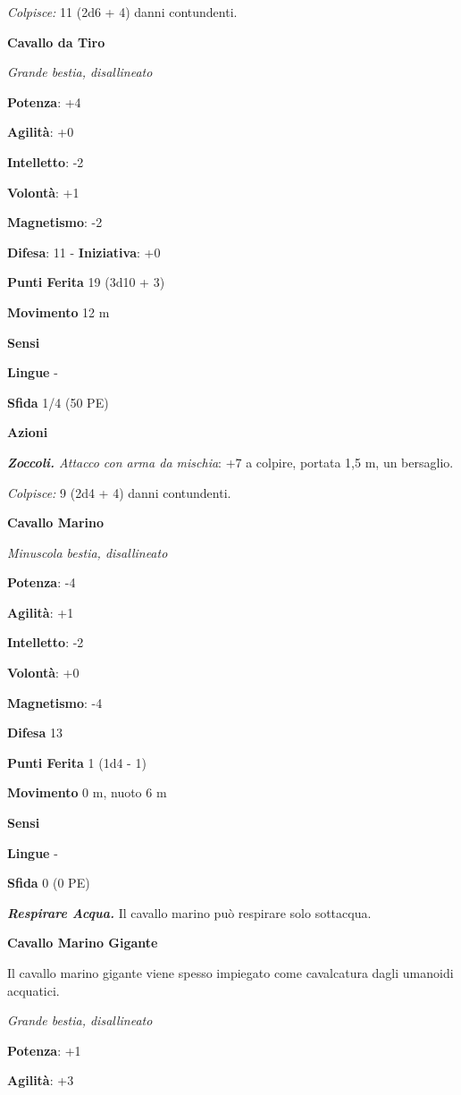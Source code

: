 \begin{multicols}{2}
\emph{Colpisce:} 11 (2d6 + 4) danni contundenti.

\textbf{Cavallo da Tiro}

\emph{Grande bestia, disallineato}

\textbf{Potenza}: +4

\textbf{Agilità}: +0

\textbf{Intelletto}: -2

\textbf{Volontà}: +1

\textbf{Magnetismo}: -2

\textbf{Difesa}: 11 - \textbf{Iniziativa}: +0

\textbf{Punti Ferita} 19 (3d10 + 3)

\textbf{Movimento} 12 m

\textbf{Sensi} 

\textbf{Lingue} -

\textbf{Sfida} 1/4 (50 PE)

\textbf{Azioni}

\emph{\textbf{Zoccoli.} Attacco con arma da mischia}: +7 a colpire,
portata 1,5 m, un bersaglio.

\emph{Colpisce:} 9 (2d4 + 4) danni contundenti.

\textbf{Cavallo Marino}

\emph{Minuscola bestia, disallineato}

\textbf{Potenza}: -4

\textbf{Agilità}: +1

\textbf{Intelletto}: -2

\textbf{Volontà}: +0

\textbf{Magnetismo}: -4

\textbf{Difesa} 13

\textbf{Punti Ferita} 1 (1d4 - 1)

\textbf{Movimento} 0 m, nuoto 6 m

\textbf{Sensi} 

\textbf{Lingue} -

\textbf{Sfida} 0 (0 PE)

\emph{\textbf{Respirare Acqua.}} Il cavallo marino può respirare solo
sottacqua.

\textbf{Cavallo Marino Gigante}

Il cavallo marino gigante viene spesso impiegato come cavalcatura dagli
umanoidi acquatici.

\emph{Grande bestia, disallineato}

\textbf{Potenza}: +1

\textbf{Agilità}: +3


\end{multicols}

